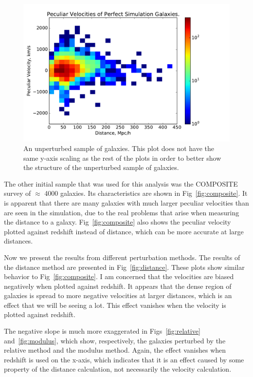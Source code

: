 \documentclass[usenatbib]{mn2e}
\begin{document}
\begin{figure}
  \begin{center}
  \includegraphics[scale=0.4]{perfectdetail}
  \end{center}
\caption{\small An unperturbed sample of galaxies. This plot does not have the same y-axis scaling as the rest of the plots in order to better show the structure of the unperturbed sample of galaxies.}
\label{fig:perfectzoom}
\end{figure}


The other initial sample that was used for this analysis was the COMPOSITE survey of $\approx$ 4000 galaxies. Its characteristics are shown in Fig~\ref{fig:composite}. It is apparent that there are many galaxies with much larger peculiar velocities than are seen in the simulation, due to the real problems that arise when measuring the distance to a galaxy. Fig~\ref{fig:composite} also shows the peculiar velocity plotted against redshift instead of distance, which can be more accurate at large distances.

Now we present the results from different perturbation methods. The results of the distance method are presented in Fig~\ref{fig:distance}. These plots show similar behavior to Fig~\ref{fig:composite}. I am concerned that the velocities are biased negatively when plotted against redshift. It appears that the dense region of galaxies is spread to more negative velocities at larger distances, which is an effect that we will be seeing a lot. This effect vanishes when the velocity is plotted against redshift.

The negative slope is much more exaggerated in Figs~\ref{fig:relative} and~\ref{fig:modulus}, which show, respectively, the galaxies perturbed by the relative method and the modulus method. Again, the effect vanishes when redshift is used on the x-axis, which indicates that it is an effect caused by some property of the distance calculation, not necessarily the velocity calculation.
\end{document}
